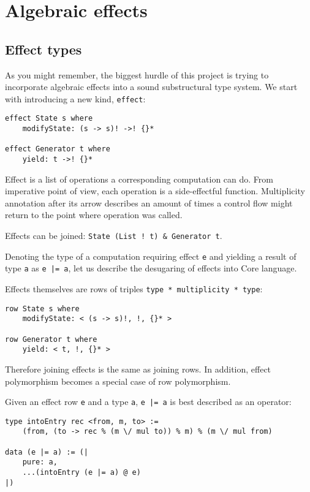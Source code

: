 \documentclass[a4paper,14pt]{extreport}
\begin{document}
\section{Algebraic effects}

\subsection{Effect types}

As you might remember, the biggest hurdle of this project is trying to
incorporate algebraic effects into a sound substructural type system. We start
with introducing a new kind, \verb|effect|:

\begin{verbatim}
effect State s where
    modifyState: (s -> s)! ->! {}*

effect Generator t where
    yield: t ->! {}*
\end{verbatim}

Effect is a list of operations a corresponding computation can do. From
imperative point of view, each operation is a side-effectful function.
Multiplicity annotation after its arrow describes an amount of times a control
flow might return to the point where operation was called.

Effects can be joined: \verb|State (List ! t) & Generator t|.

Denoting the type of a computation requiring effect \verb|e| and yielding a
result of type \verb|a| as \verb+e |= a+, let us describe the desugaring of
effects into Core language.

Effects themselves are rows of triples \verb|type * multiplicity * type|:

\begin{verbatim}
row State s where
    modifyState: < (s -> s)!, !, {}* >

row Generator t where
    yield: < t, !, {}* >
\end{verbatim}

Therefore joining effects is the same as joining rows. In addition, effect
polymorphism becomes a special case of row polymorphism.

Given an effect row \verb|e| and a type \verb|a|, \verb+e |= a+ is best
described as an operator:

\begin{verbatim}
type intoEntry rec <from, m, to> :=
    (from, (to -> rec % (m \/ mul to)) % m) % (m \/ mul from)

data (e |= a) := (|
    pure: a,
    ...(intoEntry (e |= a) @ e)
|)
\end{verbatim}
\end{document}
